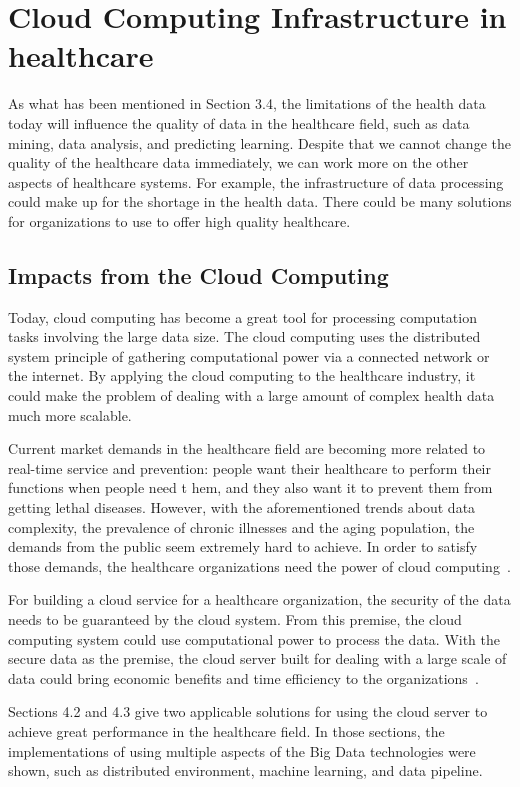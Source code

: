 \section{Cloud Computing Infrastructure in healthcare}
As what has been mentioned in Section 3.4, 
the limitations of the health 
data today will influence the quality of data 
in the healthcare 
field, such as data mining, data analysis, 
and predicting learning. Despite that 
we cannot change the quality of the healthcare 
data immediately, we can work 
more on the other aspects of healthcare systems. 
For example, the 
infrastructure of data processing could make up 
for the shortage in the health 
data. There could be many solutions for 
organizations to use to 
offer high quality healthcare.
\subsection{Impacts from the Cloud Computing}
Today, cloud computing has become a 
great tool for processing computation 
tasks involving the large data size. The 
cloud computing uses the distributed 
system principle of gathering computational 
power via a connected network 
or the internet. By applying the cloud 
computing to the healthcare industry, it 
could make the problem of dealing with a 
large amount of complex health 
data much more scalable.

Current market demands in the healthcare 
field are becoming more related to 
real-time service and prevention: people 
want their healthcare to 
perform their functions when people need t
hem, and they also want it to prevent 
them from getting lethal diseases. However, 
with the aforementioned trends 
about data complexity, the prevalence of 
chronic illnesses 
and the aging population, 
the demands from the public seem 
extremely hard to achieve. In 
order to satisfy those demands, the 
healthcare organizations need the
power of cloud computing~\cite{impact}. 

For building a cloud service for a 
healthcare organization, the security of 
the data needs to be guaranteed by 
the cloud system. From this premise, 
the cloud computing system could use 
computational power to process
the data. With the secure data as the 
premise, the cloud server built 
for dealing 
with a large scale of data could 
bring economic benefits and time 
efficiency to the 
organizations~\cite{impact}.

Sections 4.2 and 4.3 give two 
applicable solutions for using the cloud 
server to achieve great performance in 
the healthcare field. In those 
sections, the 
implementations of using multiple 
aspects of the 
Big Data technologies were shown, 
such as distributed environment, machine learning, and data pipeline.

